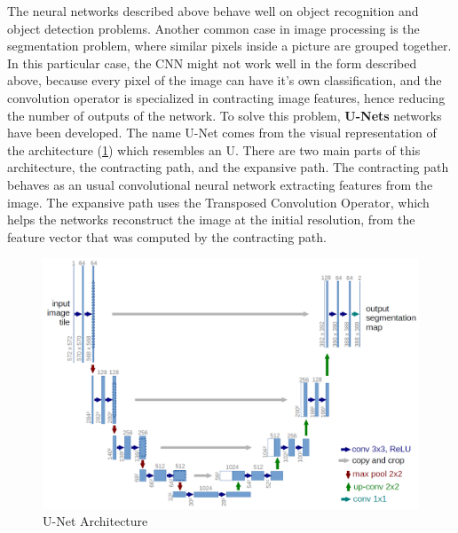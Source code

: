 The neural networks described above behave well on object recognition and object detection problems. Another common case in image processing is the segmentation problem, where similar pixels inside a picture are grouped together. In this particular case, the CNN might not work well in the form described above, because every pixel of the image can have it's own classification, and the convolution operator is specialized in contracting image features, hence reducing the number of outputs of the network. To solve this problem, \textbf{U-Nets} networks \cite{Unet} have been developed. The name U-Net comes from the visual representation of the architecture (\ref{UnetArchitecture}) which resembles an U. There are two main parts of this architecture, the contracting path, and the expansive path. The contracting path behaves as an usual convolutional neural network extracting features from the image. The expansive path uses the Transposed Convolution Operator, which helps the networks reconstruct the image at the initial resolution, from the feature vector that was computed by the contracting path.

 \begin{figure}[H]
	\includegraphics[width=\textwidth]{Pictures/012Unet.png}
	\caption{U-Net Architecture \cite{Unet}}
	\label{UnetArchitecture}
\end{figure}
